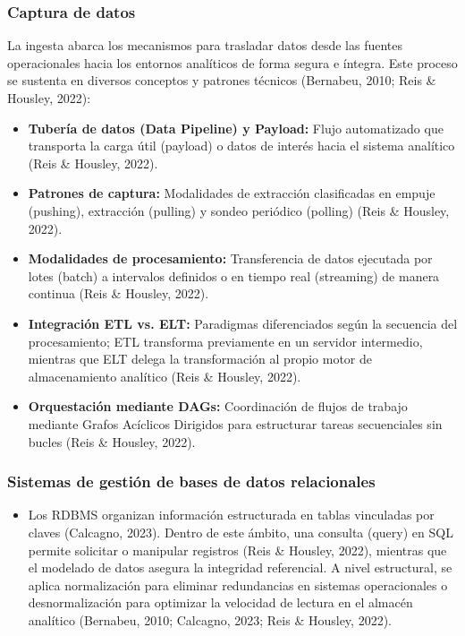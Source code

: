 \documentclass[11pt,oneside,openany]{book}
\begin{document}
\subsubsection*{Captura de datos}

La ingesta abarca los mecanismos para trasladar datos desde las fuentes operacionales hacia los entornos analíticos de forma segura e íntegra. Este proceso se sustenta en diversos conceptos y patrones técnicos (Bernabeu, 2010; Reis \& Housley, 2022):

\begin{itemize}[leftmargin=*]
\item \textbf{Tubería de datos (Data Pipeline) y Payload:} Flujo automatizado que transporta la carga útil (payload) o datos de interés hacia el sistema analítico (Reis \& Housley, 2022).
\item \textbf{Patrones de captura:} Modalidades de extracción clasificadas en empuje (pushing), extracción (pulling) y sondeo periódico (polling) (Reis \& Housley, 2022).
\item \textbf{Modalidades de procesamiento:} Transferencia de datos ejecutada por lotes (batch) a intervalos definidos o en tiempo real (streaming) de manera continua (Reis \& Housley, 2022).
\item \textbf{Integración ETL vs. ELT:} Paradigmas diferenciados según la secuencia del procesamiento; ETL transforma previamente en un servidor intermedio, mientras que ELT delega la transformación al propio motor de almacenamiento analítico (Reis \& Housley, 2022).
\item \textbf{Orquestación mediante DAGs:} Coordinación de flujos de trabajo mediante Grafos Acíclicos Dirigidos para estructurar tareas secuenciales sin bucles (Reis \& Housley, 2022).
\end{itemize}
\subsubsection*{Sistemas de gestión de bases de datos relacionales}

\begin{itemize}[leftmargin=*]
\item Los RDBMS organizan información estructurada en tablas vinculadas por claves (Calcagno, 2023). Dentro de este ámbito, una consulta (query) en SQL permite solicitar o manipular registros (Reis \& Housley, 2022), mientras que el modelado de datos asegura la integridad referencial. A nivel estructural, se aplica normalización para eliminar redundancias en sistemas operacionales o desnormalización para optimizar la velocidad de lectura en el almacén analítico (Bernabeu, 2010; Calcagno, 2023; Reis \& Housley, 2022).
\end{itemize}
\end{document}
